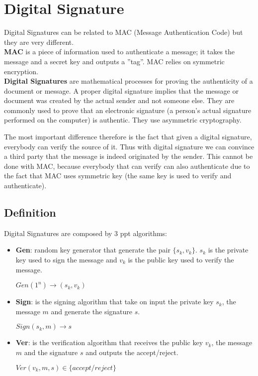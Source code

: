 \documentclass{article}
\begin{document}
\section{Digital Signature}
Digital Signatures can be related to MAC (Message Authentication Code) but they are very different. \\
\textbf{MAC} is a piece of information used to authenticate a message; it takes the message and a secret key and outputs a ''tag''. MAC relies on symmetric encryption.\\
\textbf{Digital Signatures} are mathematical processes for proving the authenticity of a document or message. A proper digital signature implies that the message or document was created by the actual sender and not someone else. They are commonly used to prove that an electronic signature (a person's actual signature performed on the computer) is authentic. They use asymmetric cryptography.

The most important difference therefore is the fact that given a digital signature, everybody can verify the source of it. Thus with digital signature we can convince a third party that the message is indeed originated by the sender. This cannot be done with MAC, because everybody that can verify can also authenticate due to the fact that MAC uses symmetric key (the same key is used to verify and authenticate).

\subsection{Definition}
Digital Signatures are composed by 3 ppt algorithms:
\begin{itemize}
\item \textbf{Gen}: random key generator that generate the pair $\{s_k,v_k\}$. $s_k$ is the private key used to sign the message and $v_k$ is the public key used to verify the message.
\begin{center}
$Gen(1^n) \rightarrow (s_k,v_k)$
\end{center}
\item \textbf{Sign}: is the signing algorithm that take on input the private key $s_k$, the message $m$ and generate the signature $s$.
\begin{center}
$Sign(s_k,m) \rightarrow s$
\end{center} 
\item \textbf{Ver}: is the verification algorithm that receives the public key $v_k$, the message $m$ and the signature $s$ and outputs the accept/reject.
\begin{center}
$Ver(v_k,m,s) \in \{accept/reject\}$
\end{center}
\end{itemize}
\end{document}
